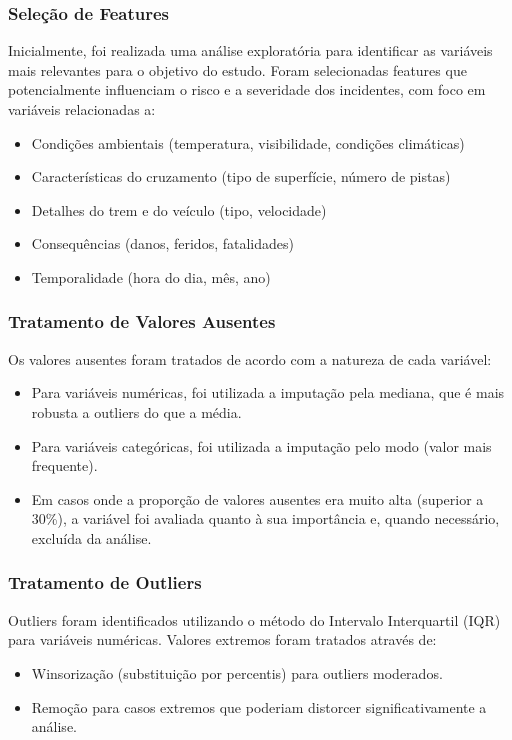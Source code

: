 \documentclass[conference]{IEEEtran}
\begin{document}
\subsubsection{Seleção de Features}
Inicialmente, foi realizada uma análise exploratória para identificar as variáveis mais relevantes para o objetivo do estudo. Foram selecionadas features que potencialmente influenciam o risco e a severidade dos incidentes, com foco em variáveis relacionadas a:

\begin{itemize}
    \item Condições ambientais (temperatura, visibilidade, condições climáticas)
    \item Características do cruzamento (tipo de superfície, número de pistas)
    \item Detalhes do trem e do veículo (tipo, velocidade)
    \item Consequências (danos, feridos, fatalidades)
    \item Temporalidade (hora do dia, mês, ano)
\end{itemize}

\subsubsection{Tratamento de Valores Ausentes}
Os valores ausentes foram tratados de acordo com a natureza de cada variável:

\begin{itemize}
    \item Para variáveis numéricas, foi utilizada a imputação pela mediana, que é mais robusta a outliers do que a média.
    \item Para variáveis categóricas, foi utilizada a imputação pelo modo (valor mais frequente).
    \item Em casos onde a proporção de valores ausentes era muito alta (superior a 30\%), a variável foi avaliada quanto à sua importância e, quando necessário, excluída da análise.
\end{itemize}

\subsubsection{Tratamento de Outliers}
Outliers foram identificados utilizando o método do Intervalo Interquartil (IQR) para variáveis numéricas. Valores extremos foram tratados através de:

\begin{itemize}
    \item Winsorização (substituição por percentis) para outliers moderados.
    \item Remoção para casos extremos que poderiam distorcer significativamente a análise.
\end{itemize}
\end{document}
